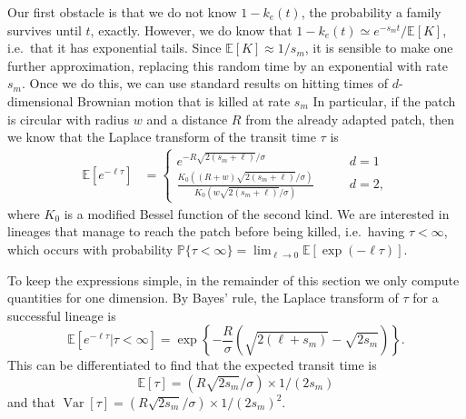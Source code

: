 \documentclass{article}
\DeclareMathOperator{\var}{Var}
\renewcommand{\P}{\mathbb{P}}
\newcommand{\E}{\mathbb{E}}
\newcommand{\plr}[1]{{\it\color{blue}(#1)}}
\begin{document}
Our first obstacle is that we do not know $1-k_e(t)$, 
the probability a family survives until $t$, exactly.
However, we do know that $1-k_e(t) \simeq e^{-s_m t} / \E[K]$,
i.e.\ that it has exponential tails.
Since $\E[K] \approx 1/s_m$, it is sensible to make one further approximation,
replacing this random time by an exponential with rate $s_m$.
Once we do this, 
we can use standard results on hitting times of $d$-dimensional Brownian motion
that is killed at rate $s_m$ \citet[][(2.2.0.1 and 4.2.0.1)]{borodin2002handbook} 
In particular, if the patch is circular with radius $w$ and a distance
$R$ from the already adapted patch, then 
we know that the Laplace transform of the transit time $\tau$ is
\begin{align}
  \E[e^{-\ell \tau}] &=
    \begin{cases}
      e^{- R \sqrt{2(s_m+\ell)}/\sigma} \qquad & d=1 \\
      \frac{ K_0( (R+w)\sqrt{2(s_m+\ell)}/\sigma) }{ K_0( w\sqrt{2(s_m+\ell)}/\sigma) } \qquad & d=2  ,
    \end{cases} \label{eqn:borodinresult}
\end{align}
where $K_0$ is a modified Bessel function of the second kind.
We are interested in lineages that manage to reach the patch before being killed,
i.e.\ having $\tau < \infty$,
which occurs with probability
$\P\{\tau < \infty\} = \lim_{\ell \to 0} \E \left[\exp(-\ell \tau) \right]$. 

To keep the expressions simple, in the remainder of this section we only compute quantities for one dimension.
By Bayes' rule, the Laplace transform of $\tau$ for a successful lineage is
\begin{equation} \label{eqn:haplen_cdf}
\E[e^{-\ell \tau}|\tau<\infty]  = \exp\left\{{-\frac{R}{\sigma}\left(\sqrt{2(\ell+s_m)} - \sqrt{2s_m}\right)}\right\} .
\end{equation}
This can be differentiated to find that the expected transit time is
\begin{equation} 
  \E[\tau] = (R\sqrt{2s_m}/\sigma)\times 1/(2s_m) \label{eqn:mean_tau}
\end{equation}
and that $\var[\tau] = (R\sqrt{2s_m}/\sigma) \times 1/(2s_m)^2$.


\end{document}
